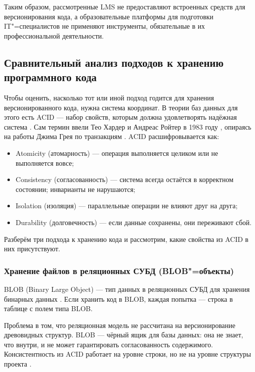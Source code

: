 \documentclass[coursework]{SCWorks}
\begin{document}
Таким образом, рассмотренные LMS не предоставляют встроенных средств для версионирования кода, а образовательные платформы для подготовки IT"=специалистов не применяют инструменты, обязательные в их профессиональной деятельности.

\subsection{Сравнительный анализ подходов к хранению программного кода}
\label{sec:comparison}

Чтобы оценить, насколько тот или иной подход годится для хранения версионированного кода, нужна система координат. В теории баз данных для этого есть ACID --- набор свойств, которым должна удовлетворять надёжная система \cite{kleppmann}. Сам термин ввели Тео Хардер и Андреас Ройтер в 1983 году \cite{haerder1983principles}, опираясь на работы Джима Грея по транзакциям \cite{gray1981transaction}. ACID расшифровывается как:

\begin{itemize}
	\item Atomicity (атомарность) --- операция выполняется целиком или не выполняется вовсе;
	\item Consistency (согласованность) --- система всегда остаётся в корректном состоянии; инварианты не нарушаются;
	\item Isolation (изоляция) --- параллельные операции не влияют друг на друга;
	\item Durability (долговечность) --- если данные сохранены, они переживают сбой.
\end{itemize}

Разберём три подхода к хранению кода и рассмотрим, какие свойства из ACID в них присутствуют.

\subsubsection{Хранение файлов в реляционных СУБД (BLOB"=объекты)}

BLOB (Binary Large Object) --- тип данных в реляционных СУБД для хранения бинарных данных \cite{garcia2009database}. Если хранить код в BLOB, каждая попытка --- строка в таблице с полем типа BLOB.

Проблема в том, что реляционная модель не рассчитана на версионирование древовидных структур. BLOB --- чёрный ящик для базы данных: она не знает, что внутри, и не может гарантировать согласованность содержимого. Консистентность из ACID работает на уровне строки, но не на уровне структуры проекта \cite{postgresacid}.
\end{document}
